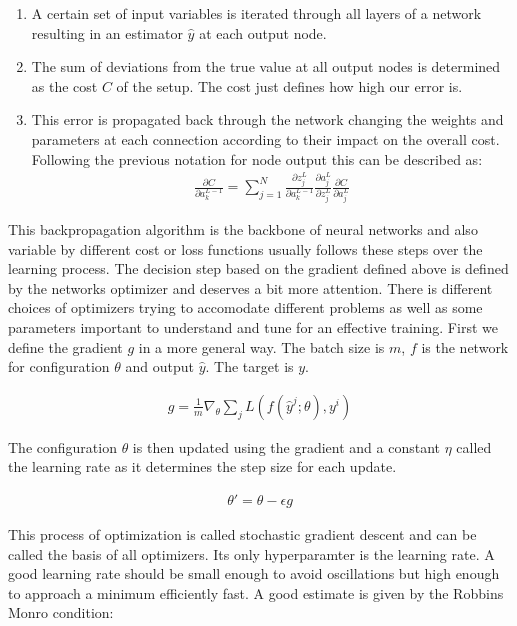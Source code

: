 \begin{enumerate}
    \item A certain set of input variables is iterated through all layers of a network resulting in an estimator $\hat{y}$ at each output node.
    \item The sum of deviations from the true value at all output nodes is determined as the cost $C$ of the setup. The cost just defines how high our error is.
    \item This error is propagated back through the network changing the weights and parameters at each connection according to their impact on the overall cost. Following the previous notation for node output this can be described as:\\
    \begin{align*}
        \frac{\partial C}{\partial a_k^{L-1}} = \sum_{j=1}^N \frac{\partial z_j^L}{\partial a_k^{L-1}} \frac{\partial a_j^L}{\partial z_j^L}\frac{\partial C}{\partial a_j^L}
    \end{align*}
\end{enumerate}

This backpropagation algorithm is the backbone of neural networks and also variable by different cost or loss functions usually follows these steps over the learning process. The decision step based on the gradient defined above is defined by the networks optimizer and deserves a bit more attention. There is different choices of optimizers trying to accomodate different problems as well as some parameters important to understand and tune for an effective training. First we define the gradient $g$ in a more general way. The batch size is $m$, $f$ is the network for configuration $\theta$ and output $\hat{y}$. The target is $y$.

\begin{align}
    g = \frac{1}{m} \nabla_{\theta} \sum_j L(f(\hat{y}^j; \theta), y^i)
\end{align}

The configuration $\theta$ is then updated using the gradient and a constant $\eta$ called the learning rate as it determines the step size for each update.

\begin{align}
    \theta \prime = \theta - \epsilon g
\end{align}

This process of optimization is called stochastic gradient descent and can be called the basis of all optimizers. Its only hyperparamter is the learning rate. A good learning rate should be small enough to avoid oscillations but high enough to approach a minimum efficiently fast. A good estimate is given by the Robbins Monro condition:


